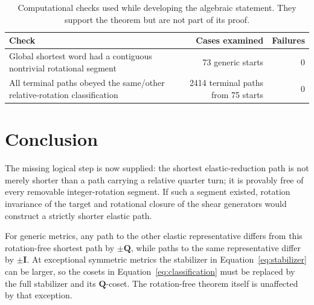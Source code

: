 \documentclass[11pt]{article}
\theoremstyle{definition}
\begin{document}
\begin{table}[htbp]
\centering
\caption{Computational checks used while developing the algebraic statement.
They support the theorem but are not part of its proof.}
\label{tab:checks}
\small
\renewcommand{\arraystretch}{1.22}
\begin{tabularx}{\textwidth}{@{}Xrr@{}}
\toprule
Check & Cases examined & Failures \\
\midrule
Global shortest word had a contiguous nontrivial rotational segment
 & 73 generic starts & 0 \\
All terminal paths obeyed the same/other relative-rotation classification
 & 2414 terminal paths from 75 starts & 0 \\
\bottomrule
\end{tabularx}
\end{table}

\section{Conclusion}

The missing logical step is now supplied: the shortest elastic-reduction
path is not merely shorter than a path carrying a relative quarter turn; it
is provably free of every removable integer-rotation segment.  If such a
segment existed, rotation invariance of the target and rotational closure of
the shear generators would construct a strictly shorter elastic path.

For generic metrics, any path to the other elastic representative differs
from this rotation-free shortest path by \(\pm\mathbf Q\), while paths to the
same representative differ by \(\pm\mathbf I\).  At exceptional symmetric
metrics the stabilizer in Equation~\eqref{eq:stabilizer} can be larger, so
the cosets in Equation~\eqref{eq:classification} must be replaced by the
full stabilizer and its \(\mathbf Q\)-coset.  The rotation-free theorem itself
is unaffected by that exception.
\end{document}
